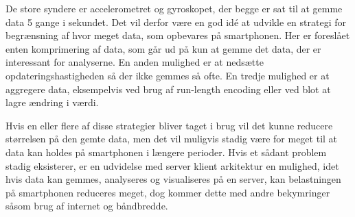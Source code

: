 De store syndere er accelerometret og gyroskopet, der begge er sat til at gemme data 5 gange i sekundet.
Det vil derfor være en god idé at udvikle en strategi for begrænsning af hvor meget data, som opbevares på smartphonen.
Her er foreslået enten komprimering af data, som går ud på kun at gemme det data, der er interessant for analyserne.
En anden mulighed er at nedsætte opdateringshastigheden så der ikke gemmes så ofte.
En tredje mulighed er at aggregere data, eksempelvis ved brug af run-length encoding eller ved blot at lagre ændring i værdi.

Hvis en eller flere af disse strategier bliver taget i brug vil det kunne reducere størrelsen på den gemte data, men det vil muligvis stadig være for meget til at data kan holdes på smartphonen i længere perioder.
Hvis et sådant problem stadig eksisterer, er en udvidelse med server klient arkitektur en mulighed, idet hvis data kan gemmes, analyseres og visualiseres på en server, kan belastningen på smartphonen reduceres meget, dog kommer dette med andre bekymringer såsom brug af internet og båndbredde.
